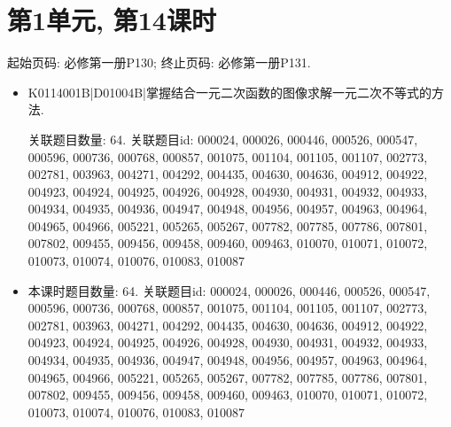 \section*{第1单元, 第14课时}
起始页码: 必修第一册P130; 终止页码: 必修第一册P131.
\begin{itemize}
\item K0114001B|D01004B|掌握结合一元二次函数的图像求解一元二次不等式的方法.

关联题目数量: 64. 关联题目id: 000024, 000026, 000446, 000526, 000547, 000596, 000736, 000768, 000857, 001075, 001104, 001105, 001107, 002773, 002781, 003963, 004271, 004292, 004435, 004630, 004636, 004912, 004922, 004923, 004924, 004925, 004926, 004928, 004930, 004931, 004932, 004933, 004934, 004935, 004936, 004947, 004948, 004956, 004957, 004963, 004964, 004965, 004966, 005221, 005265, 005267, 007782, 007785, 007786, 007801, 007802, 009455, 009456, 009458, 009460, 009463, 010070, 010071, 010072, 010073, 010074, 010076, 010083, 010087

\item 本课时题目数量: 64. 关联题目id: 000024, 000026, 000446, 000526, 000547, 000596, 000736, 000768, 000857, 001075, 001104, 001105, 001107, 002773, 002781, 003963, 004271, 004292, 004435, 004630, 004636, 004912, 004922, 004923, 004924, 004925, 004926, 004928, 004930, 004931, 004932, 004933, 004934, 004935, 004936, 004947, 004948, 004956, 004957, 004963, 004964, 004965, 004966, 005221, 005265, 005267, 007782, 007785, 007786, 007801, 007802, 009455, 009456, 009458, 009460, 009463, 010070, 010071, 010072, 010073, 010074, 010076, 010083, 010087

\end{itemize}


